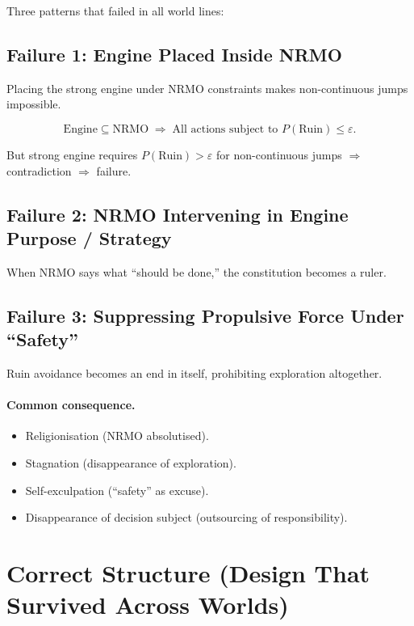 Three patterns that failed in all world lines:

\subsection{Failure 1: Engine Placed Inside NRMO}

Placing the strong engine under NRMO constraints makes
non-continuous jumps impossible.

\begin{equation}
\mathrm{Engine} \subseteq \mathrm{NRMO}
\;\Rightarrow\;
\text{All actions subject to } P(\mathrm{Ruin}) \le \varepsilon.
\end{equation}

But strong engine requires $P(\mathrm{Ruin}) > \varepsilon$ for
non-continuous jumps $\Rightarrow$ contradiction $\Rightarrow$
failure.

\subsection{Failure 2: NRMO Intervening in Engine Purpose / Strategy}

When NRMO says what ``should be done,'' the constitution becomes a
ruler.

\subsection{Failure 3: Suppressing Propulsive Force Under ``Safety''}

Ruin avoidance becomes an end in itself, prohibiting exploration
altogether.

\paragraph{Common consequence.}

\begin{itemize}
\item Religionisation (NRMO absolutised).
\item Stagnation (disappearance of exploration).
\item Self-exculpation (``safety'' as excuse).
\item Disappearance of decision subject (outsourcing of
responsibility).
\end{itemize}

\section{Correct Structure (Design That Survived Across Worlds)}
\label{sec:strong-engine-correct}

